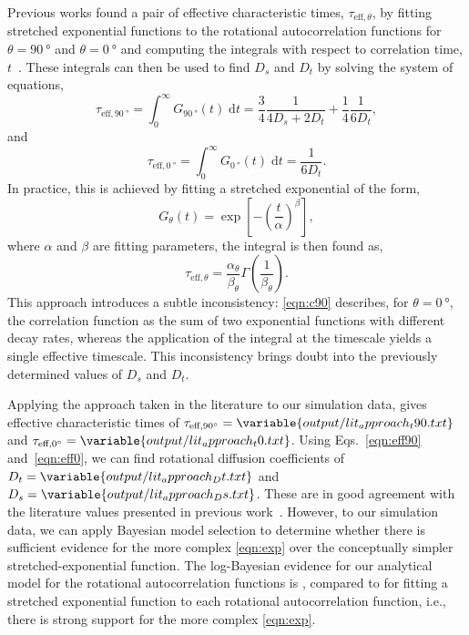 \documentclass[reprint,
               superscriptaddress,
               nobibnotes,
               amsmath,
               amssymb,
               aps,
               hidelinks, 
               pre]{revtex4-2}
\begin{document}
Previous works found a pair of effective characteristic times, $\tau_{\textrm{eff}, \theta}$, by fitting stretched exponential functions to the rotational autocorrelation functions for $\theta=\qty{90}{\degree}$ and $\theta=\qty{0}{\degree}$ and computing the integrals with respect to correlation time, $t$~\cite{Gillen1972, Laaksonen1998, Witt2000, Schwartz2005, Fu2011}.
These integrals can then be used to find $D_{s}$ and $D_{t}$ by solving the system of equations, 
%
\begin{equation}
    \tau_{\textrm{eff}, \qty{90}{\degree}} = \int_0^\infty G_{\qty{90}{\degree}}(t) \;\textrm{d}t = \frac{3}{4}\frac{1}{4 D_s + 2 D_t} + \frac{1}{4}\frac{1}{6D_t}, 
    \label{eqn:eff90}
\end{equation}
%
and
%
\begin{equation}
    \tau_{\textrm{eff}, \qty{0}{\degree}} = \int_0^\infty G_{\qty{0}{\degree}}(t) \;\textrm{d}t = \frac{1}{6D_t}.
    \label{eqn:eff0}
\end{equation}
%
In practice, this is achieved by fitting a stretched exponential of the form, 
%
\begin{equation}
    G_{\theta}(t) = \exp{\left[-\left(\frac{t}{\alpha}\right)^\beta\right]},
    \label{eqn:stretch}
\end{equation}
%
where $\alpha$ and $\beta$ are fitting parameters, the integral is then found as, 
%
\begin{equation}
    \tau_{\textrm{eff}, \theta} = \frac{\alpha_{\theta}}{\beta_\theta}\Gamma\left(\frac{1}{\beta_\theta}\right).
\end{equation}
This approach introduces a subtle inconsistency: \cref{eqn:c90} describes, for $\theta=\qty{0}{\degree}$, the correlation function as the sum of two exponential functions with different decay rates, whereas the application of the integral at the timescale yields a single effective timescale.
This inconsistency brings doubt into the previously determined values of $D_s$ and $D_t$.  

Applying the approach taken in the literature to our simulation data, gives effective characteristic times of $\tau_{\textrm{eff}, \qty{90}{\degree}} = \variable{output/lit_approach_t90.txt}$ and $\tau_{\textrm{eff}, \qty{0}{\degree}} = \variable{output/lit_approach_t0.txt}$. 
Using Eqs.~\ref{eqn:eff90} and~\ref{eqn:eff0}, we can find rotational diffusion coefficients of $D_t=\variable{output/lit_approach_Dt.txt}$ and $D_s = \variable{output/lit_approach_Ds.txt}$. 
These are in good agreement with the literature values presented in previous work~\cite{Laaksonen1998, Witt2000, Schwartz2005, Fu2011}.
However, to our simulation data, we can apply Bayesian model selection to determine whether there is sufficient evidence for the more complex \cref{eqn:exp} over the conceptually simpler stretched-exponential function.
The log-Bayesian evidence for our analytical model for the rotational autocorrelation functions is , compared to  for fitting a stretched exponential function to each rotational autocorrelation function, i.e., there is strong support for the more complex \cref{eqn:exp}. 
\end{document}
